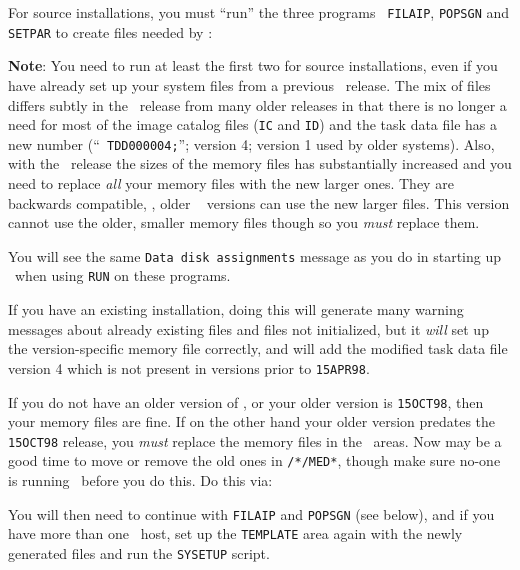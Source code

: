 For source installations, you must ``run'' the three programs {\tt
FILAIP}, {\tt POPSGN} and {\tt SETPAR} to create files needed by
\aips:\medskip

\medskip

\noindent
{\bf Note}: You need to run at least the first two for source
installations, even if you have already set up your system files from a
previous \AIPS\ release.  The mix of files differs subtly in the
\THISVER\ release from many older releases
in that there is no longer a need for most of the image catalog files
({\tt IC} and {\tt ID}) and the task data file has a new number (``{\tt
TDD000004;}''; version 4; version 1 used by older systems).  Also, with
the \THISVER\ release the sizes of the memory files has substantially
increased and you need to replace {\it all\/} your memory files with the
new larger ones.  They are backwards compatible, \ie, older \AIPS\ %
versions can use the new larger files.  This version cannot use the
older, smaller memory files though so you {\it must\/} replace them.

You will see the same {\tt Data disk assignments} message as you do in
starting up \ttaips\ when using {\tt RUN} on these programs.

\medskip{}

If you have an existing installation, doing this will generate many
warning messages about already existing files and files not initialized,
but it {\it will\/} set up the version-specific memory file correctly,
and will add the modified task data file version 4 which is not present
in versions prior to {\tt 15APR98}.

If you do not have an older version of \AIPS, or your older version is
{\tt 15OCT98}, then your memory files are fine.  If on the other hand
your older version predates the {\tt 15OCT98} release, you {\it must\/}
replace the memory files in the \ areas.  Now may be a good time to
move or remove the old ones in {\tt {}}{\tt /*/MED*}, though make
sure no-one is running \AIPS\ before you do this.  Do this via:
\medskip

\medskip

\noindent You will then need to continue with {\tt FILAIP} and
{\tt POPSGN} (see below), and if you have more than one \AIPS\ host, set
up the {\tt TEMPLATE} area again with the newly generated files and run
the {\tt SYSETUP} script.

